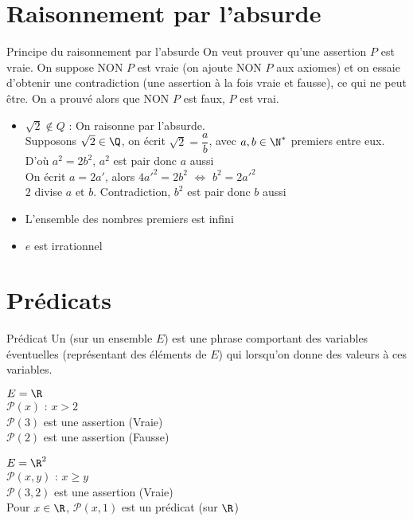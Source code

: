 \documentclass[12pt, a4paper]{report}
\begin{document}
\section{Raisonnement par l'absurde}

\begin{definition}{Principe du raisonnement par l'absurde}{}
On veut prouver qu'une assertion $P$ est vraie. On suppose NON $P$ est vraie (on ajoute NON $P$ aux axiomes) et on essaie d'obtenir une contradiction (\ie une assertion à la fois vraie et fausse), ce qui ne peut être. On a prouvé alors que NON $P$ est faux, \ie $P$ est vrai.
\end{definition}

\begin{exemple}{}{}
\begin{itemize}
    \item $\sqrt{2} \notin Q$ : On raisonne par l'absurde.\\ 
    Supposons $\sqrt{2}\in \Q$, on écrit $\sqrt{2}=\dfrac{a}{b}$, avec $a,b\in \N^*$ premiers entre eux. \\
    D'où $a^2=2b^2$, $a^2$ est pair donc $a$ aussi\\
    On écrit $a=2a'$, alors $4a'^2=2b^2$ $\Longleftrightarrow$ $b^2=2a'^2$\\
    $2$ divise $a$ et $b$. Contradiction, $b^2$ est pair donc $b$ aussi
    \item L'ensemble des nombres premiers est infini
    \item $e$ est irrationnel
\end{itemize}
\end{exemple}

\section{Prédicats}

\begin{definition}{Prédicat}{}
Un  (sur un ensemble $E$) est une phrase comportant des variables éventuelles (représentant des éléments de $E$) qui  lorsqu'on donne des valeurs à ces variables.
\end{definition}

\begin{exemple}{}{}
\begin{itemize}
\begin{multicols}{2}
    \item $E=\R$\\
    $\mathcal{P}(x)$ : $x>2$\\
    $\mathcal{P}(3)$ est une assertion (Vraie)\\ 
    $\mathcal{P}(2)$ est une assertion (Fausse)
    \item $E=\R^2$\\
    $\mathcal{P}(x,y)$ : $x\geq y$\\
    $\mathcal{P}(3,2)$ est une assertion (Vraie)\\ 
    Pour $x\in\R$, $\mathcal{P}(x,1)$ est un prédicat (sur $\R$)
\end{multicols}
\end{itemize}
\end{exemple}
\end{document}
